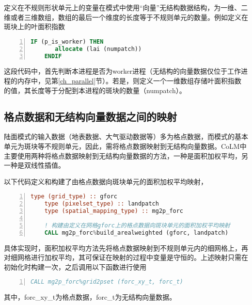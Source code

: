 定义在不规则形状单元上的变量在模式中使用“向量”无结构数据结构，为一维、二维或者三维数组，数组的最后一个维度的长度等于不规则单元的数量。例如定义在斑块上的叶面积指数
\begin{lstlisting}[language=fortran, basicstyle=\linespread{1.0}\footnotesize\ttfamily, commentstyle=\color{black}, numbers=left, numberstyle=\tiny, xleftmargin=1.5em,xrightmargin=0em, aboveskip=1em]
    IF (p_is_worker) THEN
       allocate (lai (numpatch))
    ENDIF
\end{lstlisting}
这段代码中，首先判断本进程是否为worker进程（无结构的向量数据仅位于工作进程的内存中，见第\ref{ch_parallel}节）。若是，则定义一个一维数组存储叶面积指数的值，其长度等于分配到本进程的斑块的数量（numpatch）。

\subsection{格点数据和无结构向量数据之间的映射}

陆面模式的输入数据（地表数据、大气驱动数据等）多为格点数据，而模式的基本单元为斑块等不规则单元，因此，需将格点数据映射到无结构向量数据。CoLM中主要使用两种将格点数据映射到无结构向量数据的方法，一种是面积加权平均，另一种是双线性插值。

以下代码定义和构建了由格点数据向斑块单元的面积加权平均映射，
\begin{lstlisting}[language=fortran, basicstyle=\linespread{1.0}\footnotesize\ttfamily, commentstyle=\color{black}, numbers=left, numberstyle=\tiny, xleftmargin=1.5em,xrightmargin=0em, aboveskip=1em]
    type (grid_type) :: gforc
    type (pixelset_type) :: landpatch
    type (spatial_mapping_type) :: mg2p_forc

    ! 构建由定义在网格gforc上的格点数据向斑块单元的面积加权平均映射
    CALL mg2p_forc%build_arealweighted (gforc, landpatch)
\end{lstlisting}
具体实现时，面积加权平均方法先将格点数据映射到不规则单元内的细网格上，再对细网格进行加权平均，其可保证在映射的过程中变量是守恒的。上述映射只需在初始化时构建一次，之后调用以下函数进行使用
\begin{lstlisting}[language=fortran, basicstyle=\linespread{1.0}\footnotesize\ttfamily, commentstyle=\color{black}, numbers=left, numberstyle=\tiny, xleftmargin=1.5em,xrightmargin=0em, aboveskip=1em]
    CALL mg2p_forc%grid2pset (forc_xy_t, forc_t)
\end{lstlisting}
其中，forc\_xy\_t为格点数据，forc\_t为无结构向量数据。

